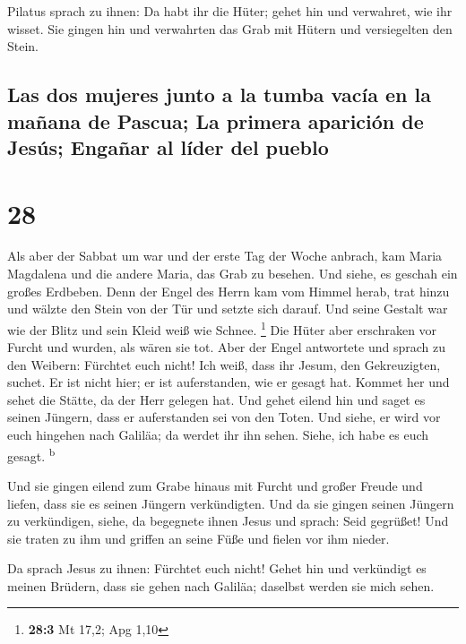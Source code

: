  Pilatus sprach zu ihnen: Da habt ihr die Hüter; gehet
hin und verwahret, wie ihr wisset.  Sie gingen hin und
verwahrten das Grab mit Hütern und versiegelten den Stein.

\hypertarget{las-dos-mujeres-junto-a-la-tumba-vacuxeda-en-la-mauxf1ana-de-pascua-la-primera-apariciuxf3n-de-jesuxfas-engauxf1ar-al-luxedder-del-pueblo}{%
\subsection{Las dos mujeres junto a la tumba vacía en la mañana de
Pascua; La primera aparición de Jesús; Engañar al líder del
pueblo}\label{las-dos-mujeres-junto-a-la-tumba-vacuxeda-en-la-mauxf1ana-de-pascua-la-primera-apariciuxf3n-de-jesuxfas-engauxf1ar-al-luxedder-del-pueblo}}

\hypertarget{section-27}{%
\section{28}\label{section-27}}

 Als aber der Sabbat um war und der erste Tag der Woche
anbrach, kam Maria Magdalena und die andere Maria, das Grab zu besehen.
 Und siehe, es geschah ein großes Erdbeben. Denn der Engel
des Herrn kam vom Himmel herab, trat hinzu und wälzte den Stein von der
Tür und setzte sich darauf.  Und seine Gestalt war wie der
Blitz und sein Kleid weiß wie Schnee. \footnote{\textbf{28:3} Mt 17,2;
  Apg 1,10}  Die Hüter aber erschraken vor Furcht und
wurden, als wären sie tot.  Aber der Engel antwortete und
sprach zu den Weibern: Fürchtet euch nicht! Ich weiß, dass ihr Jesum,
den Gekreuzigten, suchet.  Er ist nicht hier; er ist
auferstanden, wie er gesagt hat. Kommet her und sehet die Stätte, da der
Herr gelegen hat.  Und gehet eilend hin und saget es
seinen Jüngern, dass er auferstanden sei von den Toten. Und siehe, er
wird vor euch hingehen nach Galiläa; da werdet ihr ihn sehen. Siehe, ich
habe es euch gesagt. \textsuperscript{b}

 Und sie gingen eilend zum Grabe hinaus mit Furcht und
großer Freude und liefen, dass sie es seinen Jüngern verkündigten. Und
da sie gingen seinen Jüngern zu verkündigen,  siehe, da
begegnete ihnen Jesus und sprach: Seid gegrüßet! Und sie traten zu ihm
und griffen an seine Füße und fielen vor ihm nieder.

 Da sprach Jesus zu ihnen: Fürchtet euch nicht! Gehet hin
und verkündigt es meinen Brüdern, dass sie gehen nach Galiläa; daselbst
werden sie mich sehen.

